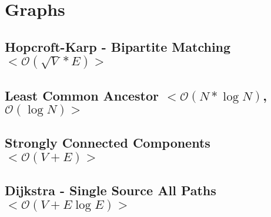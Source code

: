 \documentclass[10pt, a4paper, twoside, notitlepage]{article}
\begin{document}
\begin{titlepage}
\maketitle
\tableofcontents
\alignbottom{\doclicenseThis}
\end{titlepage}


%
%
%
%

\section{Graphs}

\subsection{Hopcroft-Karp - Bipartite Matching $<\mathcal{O}(\sqrt{V}*E)>$}



\newpage

\subsection{Least Common Ancestor $<\mathcal{O}(N*\log N)$, $\mathcal{O}(\log N)>$}



\newpage

\subsection{Strongly Connected Components $<\mathcal{O}(V+E)>$}



\newpage

\subsection{Dijkstra - Single Source All Paths $<\mathcal{O}(V+E\log E)>$}
\end{document}
